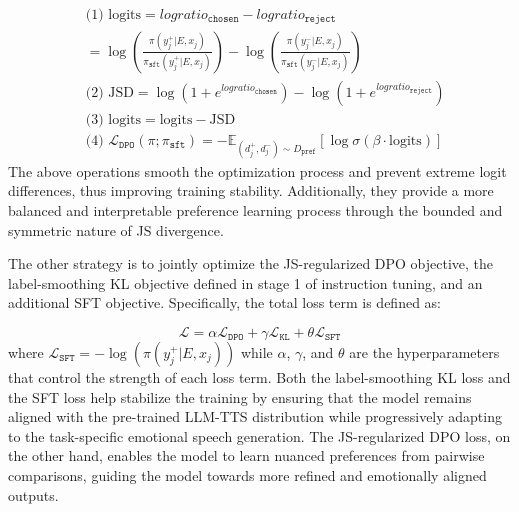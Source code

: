 \begin{equation*}
\begin{aligned}
&\text{(1) logits} = logratio_{\texttt{chosen}} - logratio_{\texttt{reject}} \\
                  &= \log \left( \frac{\pi(y^{+}_j | E, x_j)}{\pi_{\texttt{sft}}(y^{+}_j | E, x_j)} \right) 
                     - \log \left( \frac{\pi(y^{-}_j | E, x_j)}{\pi_{\texttt{sft}}(y^{-}_j | E, x_j)} \right) \\
&\text{(2) JSD}   = \log \left( 1 + e^{logratio_{\texttt{chosen}}} \right)
                     - \log \left( 1 + e^{logratio_{\texttt{reject}}} \right) \\
& \text{(3) logits} = \text{logits} - \text{JSD} \\
& \text{(4) } \mathcal{L}_{\texttt{DPO}}(\pi; \pi_{\texttt{sft}}) = - \mathbb{E}_{(d_j^+, d_j^-) \sim D_{\texttt{pref}}} \left[ \log \sigma \left( \beta \cdot \text{logits} \right) \right]
\end{aligned}
\end{equation*}
The above operations smooth the optimization process and prevent extreme logit differences, thus improving training stability. Additionally, they provide a more balanced and interpretable preference learning process through the bounded and symmetric nature of JS divergence. 

The other strategy is to jointly optimize the JS-regularized DPO objective, the label-smoothing KL objective defined in stage 1 of instruction tuning, and an additional SFT objective. Specifically, the total loss term is defined as:

\begin{equation*}
\mathcal{L} = \alpha \mathcal{L}_{\texttt{DPO}} + \gamma \mathcal{L}_{\texttt{KL}} + \theta \mathcal{L}_{\texttt{SFT}}
\end{equation*}
where $\mathcal{L}_{\texttt{SFT}} = -\log(\pi(y^{+}_j | E, x_j))$ while $\alpha$, $\gamma$, and $\theta$ are the hyperparameters that control the strength of each loss term. Both the label-smoothing KL loss and the SFT loss help stabilize the training by ensuring that the model remains aligned with the pre-trained LLM-TTS distribution while progressively adapting to the task-specific emotional speech generation. The JS-regularized DPO loss, on the other hand, enables the model to learn nuanced preferences from pairwise comparisons, guiding the model towards more refined and emotionally aligned outputs.


